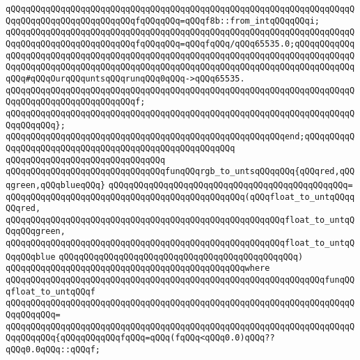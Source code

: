 \verb|qQQqqQQqqQQqqQQqqQQqqQQqqQQqqQQqqQQqqQQqqQQqqQQqqQQqqQQqqQQqqQQqqQQqqQQqqQQqqQQqqQQqqQQqqQQqqQQqfqQQqqQQq=qQQqf8b::from_intqQQqqQQqi;|\newline
\newline
\verb|qQQqqQQqqQQqqQQqqQQqqQQqqQQqqQQqqQQqqQQqqQQqqQQqqQQqqQQqqQQqqQQqqQQqqQQqqQQqqQQqqQQqqQQqqQQqqQQqfqQQqqQQq=qQQqfqQQq/qQQq65535.0;qQQqqQQqqQQqqQQqqQQqqQQqqQQqqQQqqQQqqQQqqQQqqQQqqQQqqQQqqQQqqQQqqQQqqQQqqQQqqQQqqQQqqQQqqQQqqQQqqQQqqQQqqQQqqQQqqQQqqQQqqQQqqQQqqQQqqQQqqQQqqQQqqQQqqQQqqQQq#qQQqOurqQQquntsqQQqrunqQQq0qQQq->qQQq65535.|\newline
\newline
\verb|qQQqqQQqqQQqqQQqqQQqqQQqqQQqqQQqqQQqqQQqqQQqqQQqqQQqqQQqqQQqqQQqqQQqqQQqqQQqqQQqqQQqqQQqqQQqqQQqf;|\newline
\verb|qQQqqQQqqQQqqQQqqQQqqQQqqQQqqQQqqQQqqQQqqQQqqQQqqQQqqQQqqQQqqQQqqQQqqQQqqQQqqQQq};|\newline
\verb|qQQqqQQqqQQqqQQqqQQqqQQqqQQqqQQqqQQqqQQqqQQqqQQqqQQqqQQqend;qQQqqQQqqQQqqQQqqQQqqQQqqQQqqQQqqQQqqQQqqQQqqQQqqQQqqQQq|\newline
\verb|qQQqqQQqqQQqqQQqqQQqqQQqqQQqqQQq|\newline
\newline
\verb|qQQqqQQqqQQqqQQqqQQqqQQqqQQqqQQqfunqQQqrgb_to_untsqQQqqQQq{qQQqred,qQQqgreen,qQQqblueqQQq}|\newline
\verb|qQQqqQQqqQQqqQQqqQQqqQQqqQQqqQQqqQQqqQQqqQQqqQQq=|\newline
\verb|qQQqqQQqqQQqqQQqqQQqqQQqqQQqqQQqqQQqqQQqqQQqqQQq(qQQqfloat_to_untqQQqqQQqred,|\newline
\verb|qQQqqQQqqQQqqQQqqQQqqQQqqQQqqQQqqQQqqQQqqQQqqQQqqQQqqQQqfloat_to_untqQQqqQQqgreen,|\newline
\verb|qQQqqQQqqQQqqQQqqQQqqQQqqQQqqQQqqQQqqQQqqQQqqQQqqQQqqQQqfloat_to_untqQQqqQQqblue|\newline
\verb|qQQqqQQqqQQqqQQqqQQqqQQqqQQqqQQqqQQqqQQqqQQqqQQq)|\newline
\verb|qQQqqQQqqQQqqQQqqQQqqQQqqQQqqQQqqQQqqQQqqQQqqQQqwhere|\newline
\verb|qQQqqQQqqQQqqQQqqQQqqQQqqQQqqQQqqQQqqQQqqQQqqQQqqQQqqQQqqQQqqQQqfunqQQqfloat_to_untqQQqf|\newline
\verb|qQQqqQQqqQQqqQQqqQQqqQQqqQQqqQQqqQQqqQQqqQQqqQQqqQQqqQQqqQQqqQQqqQQqqQQqqQQqqQQq=|\newline
\verb|qQQqqQQqqQQqqQQqqQQqqQQqqQQqqQQqqQQqqQQqqQQqqQQqqQQqqQQqqQQqqQQqqQQqqQQqqQQqqQQq{qQQqqQQqqQQqfqQQq=qQQq(fqQQq<qQQq0.0)qQQq??qQQq0.0qQQq::qQQqf;|\newline
